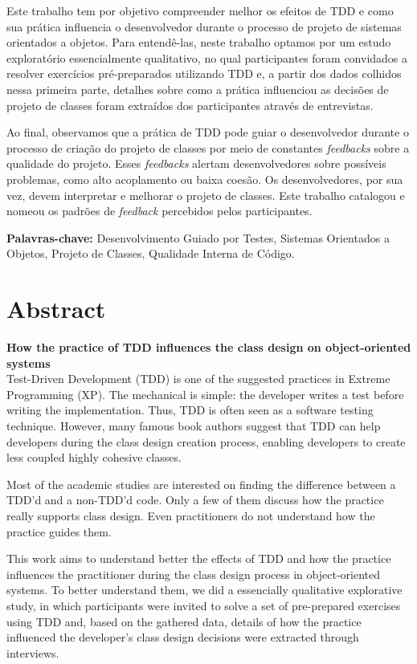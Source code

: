 \documentclass[11pt,openany,twoside,a4paper]{book}
\begin{document}
Este trabalho tem por objetivo compreender melhor os efeitos de TDD e como sua prática 
influencia o desenvolvedor durante o processo de projeto de sistemas orientados a objetos.
Para entendê-las, neste trabalho optamos por um estudo exploratório
essencialmente qualitativo,
no qual participantes foram convidados a resolver exercícios 
pré-preparados utilizando TDD e, a partir 
dos dados colhidos nessa primeira parte, detalhes sobre como a prática influenciou as 
decisões de projeto de classes foram extraídos dos participantes através de 
entrevistas.

Ao final, observamos que a prática de TDD pode guiar o desenvolvedor durante o processo
de criação do projeto de classes por meio de constantes \textit{feedbacks} sobre a qualidade
do projeto. Esses \textit{feedbacks} alertam desenvolvedores sobre possíveis problemas,
como alto acoplamento ou baixa coesão. Os desenvolvedores, por sua vez, devem interpretar
e melhorar o projeto de classes. Este trabalho catalogou e nomeou os padrões de
\textit{feedback} percebidos pelos participantes.

\noindent \textbf{Palavras-chave:} Desenvolvimento Guiado por Testes, Sistemas Orientados
a Objetos, Projeto de Classes, Qualidade Interna de Código.

\chapter*{Abstract}

\textbf{How the practice of TDD influences the class design on object-oriented systems}
\\

Test-Driven Development (TDD) is one of the suggested practices in Extreme
Programming (XP). The mechanical is simple: the developer writes a test before
writing the implementation. Thus, TDD is often seen as
a software testing technique. However, many famous book authors suggest that
TDD can help developers during the class design creation
process, enabling developers to create less coupled highly cohesive classes.

Most of the academic studies are interested on finding the difference between
a TDD'd and a non-TDD'd code. Only a few of them discuss how the practice
really supports class design. Even practitioners
do not understand how the practice guides them.

This work aims to understand better the effects of TDD and how the practice influences the
practitioner during the class design process in object-oriented systems. 
To better understand them, we did a essencially qualitative explorative study,
in which participants were invited to solve a set of pre-prepared exercises
using TDD and, based on the gathered data, details of how the practice
influenced the developer's class design decisions were extracted through
interviews.
\end{document}
